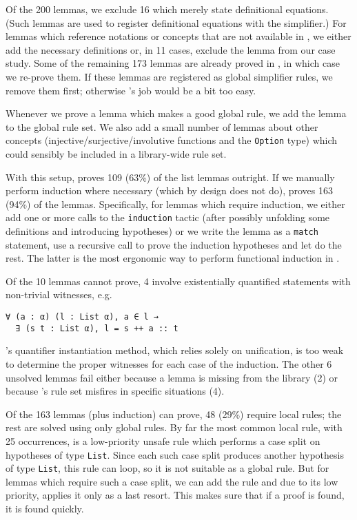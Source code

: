 Of the 200 lemmas, we exclude 16 which merely state definitional equations.
(Such lemmas are used to register definitional equations with the simplifier.)
For lemmas which reference notations or concepts that are not available in
\Leanfour, we either add the necessary definitions or, in 11 cases, exclude the
lemma from our case study. Some of the remaining 173 lemmas are already proved
in \Leanfour, in which case we re-prove them. If these lemmas are registered as
global simplifier rules, we remove them first; otherwise \Aesop's job would be a
bit too easy.

Whenever we prove a lemma which makes a good global \Aesop{} rule, we add the
lemma to the global \Aesop{} rule set. We also add a small number of lemmas
about other concepts (injective/surjective/involutive functions and the
\texttt{Option} type) which could sensibly be included in a library-wide
\Aesop{} rule set.

With this setup, \Aesop{} proves 109 (63\%) of the list lemmas outright. If we
manually perform induction where necessary (which \Aesop{} by design does not
do), \Aesop{} proves 163 (94\%) of the lemmas. Specifically, for lemmas which
require induction, we either add one or more calls to the \texttt{induction}
tactic (after possibly unfolding some definitions and introducing hypotheses) or
we write the lemma as a \texttt{match} statement, use a recursive call to prove
the induction hypotheses and let \Aesop{} do the rest. The latter is the most
ergonomic way to perform functional induction in \Lean.

Of the 10 lemmas \Aesop{} cannot prove, 4 involve existentially quantified
statements with non-trivial witnesses, e.g.
\begin{lstlisting}
∀ (a : α) (l : List α), a ∈ l →
  ∃ (s t : List α), l = s ++ a :: t
\end{lstlisting}
\Aesop's quantifier instantiation method, which relies solely on unification, is
too weak to determine the proper witnesses for each case of the induction. The
other 6 unsolved lemmas fail either because a lemma is missing from the library
(2) or because \Aesop's rule set misfires in specific situations (4).

Of the 163 lemmas \Aesop{} (plus induction) can prove, 48 (29\%) require local
rules; the rest are solved using only global rules. By far the most common local
rule, with 25 occurrences, is a low-priority unsafe rule which performs a case
split on hypotheses of type \texttt{List}. Since each such case split produces
another hypothesis of type \texttt{List}, this rule can loop, so it is not
suitable as a global rule. But for lemmas which require such a case split, we
can add the rule and due to its low priority, \Aesop{} applies it only as a last
resort. This makes sure that if a proof is found, it is found quickly.

